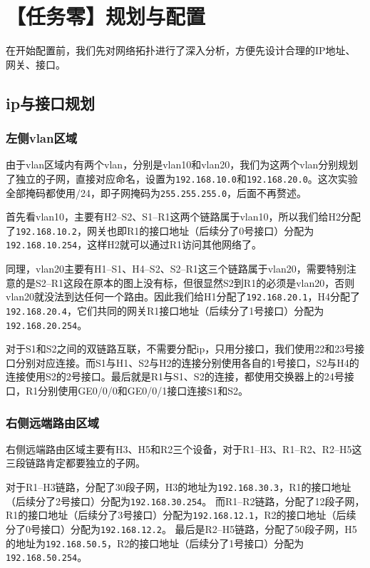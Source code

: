 \documentclass[a4paper]{article}
\begin{document}
\newpage

\section{【任务零】规划与配置}

在开始配置前，我们先对网络拓扑进行了深入分析，方便先设计合理的IP地址、网关、接口。

\subsection{ip与接口规划}

\subsubsection{左侧vlan区域}

由于vlan区域内有两个vlan，分别是vlan10和vlan20，我们为这两个vlan分别规划了独立的子网，直接对应命名，设置为\texttt{192.168.10.0}和\texttt{192.168.20.0}。这次实验全部掩码都使用/24，即子网掩码为\texttt{255.255.255.0}，后面不再赘述。

首先看vlan10，主要有H2--S2、S1--R1这两个链路属于vlan10，所以我们给H2分配了\texttt{192.168.10.2}，网关也即R1的接口地址（后续分了0号接口）分配为\texttt{192.168.10.254}，这样H2就可以通过R1访问其他网络了。

同理，vlan20主要有H1--S1、H4--S2、S2--R1这三个链路属于vlan20，需要特别注意的是S2--R1这段在原本的图上没有标，但很显然S2到R1的必须是vlan20，否则vlan20就没法到达任何一个路由。因此我们给H1分配了\texttt{192.168.20.1}，H4分配了\texttt{192.168.20.4}，它们共同的网关R1接口地址（后续分了1号接口）分配为\texttt{192.168.20.254}。

对于S1和S2之间的双链路互联，不需要分配ip，只用分接口，我们使用22和23号接口分别对应连接。而S1与H1、S2与H2的连接分别使用各自的1号接口，S2与H4的连接使用S2的2号接口。最后就是R1与S1、S2的连接，都使用交换器上的24号接口，R1分别使用GE0/0/0和GE0/0/1接口连接S1和S2。

\subsubsection{右侧远端路由区域}

右侧远端路由区域主要有H3、H5和R2三个设备，对于R1--H3、R1--R2、R2--H5这三段链路肯定都要独立的子网。

对于R1--H3链路，分配了30段子网，H3的地址为\texttt{192.168.30.3}，R1的接口地址（后续分了2号接口）分配为\texttt{192.168.30.254}。
而R1--R2链路，分配了12段子网，R1的接口地址（后续分了3号接口）分配为\texttt{192.168.12.1}，R2的接口地址（后续分了0号接口）分配为\texttt{192.168.12.2}。
最后是R2--H5链路，分配了50段子网，H5的地址为\texttt{192.168.50.5}，R2的接口地址（后续分了1号接口）分配为\texttt{192.168.50.254}。
\end{document}
